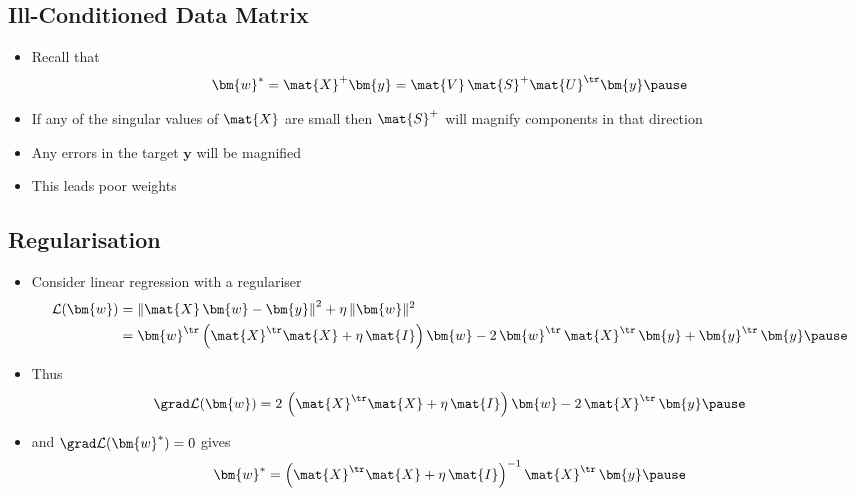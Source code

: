 \begin{slide}
\section{Ill-Conditioned Data Matrix}

\begin{PauseHighLight}
  \begin{itemize}
  \item Recall that
    \begin{align*}
      \bm{w}^* = \mat{X}^{+} \bm{y} =  \mat{V}\,\mat{S}^{+} \mat{U}^\tr \bm{y}\pause
    \end{align*}
  \item If any of the singular values of $\mat{X}$ are small then
    $\mat{S}^{+}$ will magnify components in that direction\pause
  \item Any errors in the target $\bm{y}$ will be magnified\pause
  \item This leads poor weights\pause
  \end{itemize}
\end{PauseHighLight}

\end{slide}


\begin{slide}
\section{Regularisation}

\begin{PauseHighLight}
  \begin{itemize}
  \item Consider linear regression with a regulariser
    \begin{align*}
      \mathcal{L}(\bm{w})
      &=  \left\| \mat{X}\,\bm{w} - \bm{y} \right\|^2 + \eta \, \|\bm{w}\|^2
      \\
      &= \bm{w}^\tr \left(\mat{X}^\tr \mat{X} + \eta \, \mat{I}
        \right) \bm{w}  - 2 \, \bm{w}^\tr \, \mat{X}^\tr \, \bm{y} +
        \bm{y}^\tr\,\bm{y} \pause
    \end{align*}
  \item Thus
    \begin{align*}
      \grad \mathcal{L}(\bm{w}) = 2 \,
      \left(\mat{X}^\tr \mat{X} + \eta \, \mat{I} \right) \bm{w}
      - 2 \, \mat{X}^\tr \, \bm{y}\pause
    \end{align*}
  \item and $\grad \mathcal{L}(\bm{w}^*)=0$ gives
    \begin{align*}
      \bm{w}^* = \left(\mat{X}^\tr \mat{X} + \eta \, \mat{I}
      \right)^{-1} \mat{X}^\tr \, \bm{y}\pause
    \end{align*}
  \end{itemize}
\end{PauseHighLight}

\end{slide}

